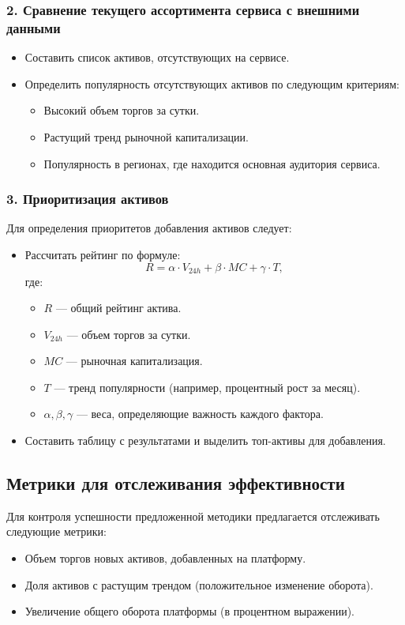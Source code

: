 \documentclass[12pt]{article}
\theoremstyle{indented}
\theoremstyle{definition}
\theoremstyle{remark}
\begin{document}
\subsubsection*{2. Сравнение текущего ассортимента сервиса с внешними данными}
\begin{itemize}
    \item Составить список активов, отсутствующих на сервисе.
    \item Определить популярность отсутствующих активов по следующим критериям:
    \begin{itemize}
        \item Высокий объем торгов за сутки.
        \item Растущий тренд рыночной капитализации.
        \item Популярность в регионах, где находится основная аудитория сервиса.
    \end{itemize}
\end{itemize}

\subsubsection*{3. Приоритизация активов}
Для определения приоритетов добавления активов следует:
\begin{itemize}
    \item Рассчитать рейтинг по формуле:
    \[
    R = \alpha \cdot V_{24h} + \beta \cdot MC + \gamma \cdot T,
    \]
    где:
    \begin{itemize}
        \item $R$ — общий рейтинг актива.
        \item $V_{24h}$ — объем торгов за сутки.
        \item $MC$ — рыночная капитализация.
        \item $T$ — тренд популярности (например, процентный рост за месяц).
        \item $\alpha, \beta, \gamma$ — веса, определяющие важность каждого фактора.
    \end{itemize}
    \item Составить таблицу с результатами и выделить топ-активы для добавления.
\end{itemize}

\subsection*{Метрики для отслеживания эффективности}
Для контроля успешности предложенной методики предлагается отслеживать следующие метрики:
\begin{itemize}
    \item Объем торгов новых активов, добавленных на платформу.
    \item Доля активов с растущим трендом (положительное изменение оборота).
    \item Увеличение общего оборота платформы (в процентном выражении).
\end{itemize}
\end{document}
